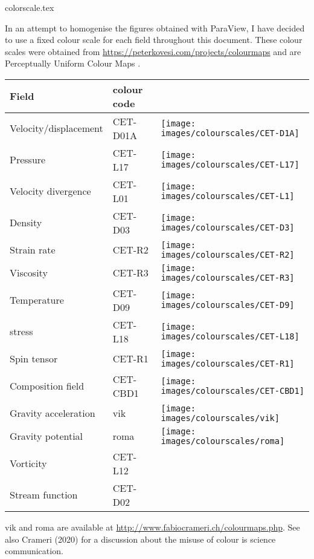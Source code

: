 \begin{flushright} {\tiny {\color{gray} colorscale.tex}} \end{flushright}

In an attempt to homogenise the figures obtained with ParaView, I have decided to use 
a fixed colour scale for each field throughout this document. These colour scales were 
obtained from \url{https://peterkovesi.com/projects/colourmaps} and are 
Perceptually Uniform Colour Maps \cite{kove15}. 

\begin{center}
\begin{tabular}{lll}
\hline
Field & colour code & \\
\hline\hline
Velocity/displacement & CET-D01A & \texttt{[image: images/colourscales/CET-D1A]}\\
\hline
Pressure& CET-L17 & \texttt{[image: images/colourscales/CET-L17]}\\
\hline
Velocity divergence& CET-L01 & \texttt{[image: images/colourscales/CET-L1]}\\
\hline
Density& CET-D03 & \texttt{[image: images/colourscales/CET-D3]}\\
\hline
Strain rate& CET-R2 & \texttt{[image: images/colourscales/CET-R2]}\\
\hline
Viscosity & CET-R3 & \texttt{[image: images/colourscales/CET-R3]}\\
\hline
Temperature & CET-D09 & \texttt{[image: images/colourscales/CET-D9]}\\
\hline
stress & CET-L18 &  \texttt{[image: images/colourscales/CET-L18]}\\
\hline
Spin tensor & CET-R1 &  \texttt{[image: images/colourscales/CET-R1]}\\
\hline
Composition field & CET-CBD1 & \texttt{[image: images/colourscales/CET-CBD1]}\\
\hline
Gravity acceleration & vik &  \texttt{[image: images/colourscales/vik]}\\
\hline
Gravity potential & roma &  \texttt{[image: images/colourscales/roma]}\\
\hline
Vorticity & CET-L12 & \\
\hline
Stream function & CET-D02 & \\
\end{tabular}
\end{center}

vik and roma are available at \url{http://www.fabiocrameri.ch/colourmaps.php}.
See also Crameri \etal (2020) for a discussion about the misuse of 
colour is science communication.





